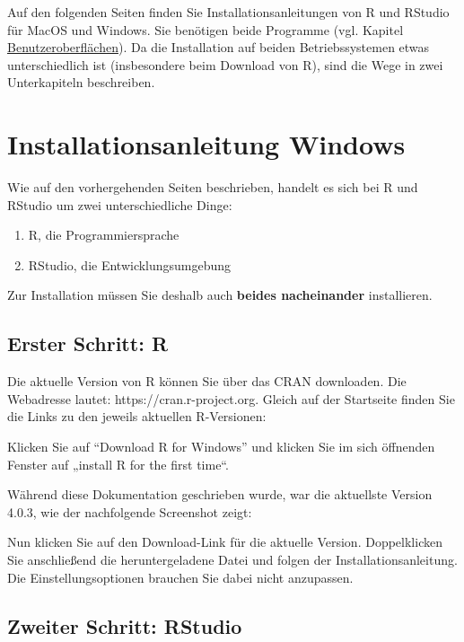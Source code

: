 \documentclass[
]{book}
\begin{document}
Auf den folgenden Seiten finden Sie Installationsanleitungen von R und RStudio für MacOS und Windows. Sie benötigen beide Programme (vgl. Kapitel \protect\hyperlink{benutzeroberfluxe4chen}{Benutzeroberflächen}).
Da die Installation auf beiden Betriebssystemen etwas unterschiedlich ist (insbesondere beim Download von R), sind die Wege in zwei Unterkapiteln beschreiben.

\hypertarget{installationsanleitung-windows}{%
\section{Installationsanleitung Windows}\label{installationsanleitung-windows}}

Wie auf den vorhergehenden Seiten beschrieben, handelt es sich bei R und RStudio um zwei unterschiedliche Dinge:

\begin{enumerate}
\def\labelenumi{\arabic{enumi}.}
\item
  R, die Programmiersprache
\item
  RStudio, die Entwicklungsumgebung
\end{enumerate}

Zur Installation müssen Sie deshalb auch \textbf{beides nacheinander} installieren.

\hypertarget{erster-schritt-r}{%
\subsection{Erster Schritt: R}\label{erster-schritt-r}}

Die aktuelle Version von R können Sie über das CRAN downloaden. Die Webadresse lautet: https://cran.r-project.org. Gleich auf der Startseite finden Sie die Links zu den jeweils aktuellen R-Versionen:

Klicken Sie auf ``Download R for Windows'' und klicken Sie im sich öffnenden Fenster auf „install R for the first time``.

Während diese Dokumentation geschrieben wurde, war die aktuellste Version 4.0.3, wie der nachfolgende Screenshot zeigt:

Nun klicken Sie auf den Download-Link für die aktuelle Version. Doppelklicken Sie anschließend die heruntergeladene Datei und folgen der Installationsanleitung. Die Einstellungsoptionen brauchen Sie dabei nicht anzupassen.

\hypertarget{zweiter-schritt-rstudio}{%
\subsection{Zweiter Schritt: RStudio}\label{zweiter-schritt-rstudio}}
\end{document}
